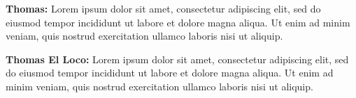 \documentclass[10pt,twoside]{article}
\newlength{\mpwidth}
\begin{document}
\begin{lrbox}{\lstbox}
\begin{minipage}{\mpwidth}
\begin{tcolorbox}[width=\linewidth,left skip=3pt, right skip=3pt, beforeafter skip=2pt]
\vspace{-6pt}
{\fontsize{6}{6}\selectfont
\begin{ldescription}
\item[\textbf{Thomas:}]
Lorem ipsum dolor sit amet, consectetur adipiscing elit, sed do eiusmod tempor
incididunt ut labore et dolore magna aliqua. Ut enim ad minim veniam, quis
nostrud exercitation ullamco laboris nisi ut aliquip.
\end{ldescription}}
\end{tcolorbox}
\begin{tcolorbox}[width=\linewidth, left skip=18pt, right skip=3pt, beforeafter skip=2pt]
{\fontsize{6}{8}\selectfont
\vspace{-6pt}
\begin{ldescription}
\item[\textbf{Thomas El Loco:}]
Lorem ipsum dolor sit amet, consectetur adipiscing elit, sed do eiusmod tempor
incididunt ut labore et dolore magna aliqua. Ut enim ad minim veniam, quis
nostrud exercitation ullamco laboris nisi ut aliquip.
\end{ldescription}}

\end{tcolorbox}
\vspace{1pt}
\end{minipage}
\end{lrbox}

\smallskip
\fbox{\usebox{\lstbox}}
\smallskip

\lipsum
\clearpage
\layout
\clearpage
\layout
\end{document}
